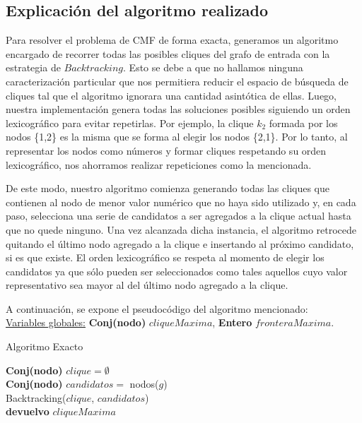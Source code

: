 \subsection{Explicación del algoritmo realizado}

Para resolver el problema de CMF de forma exacta, generamos un algoritmo encargado de recorrer todas las posibles cliques del grafo de entrada con la estrategia de $Backtracking$. Esto se debe a que no hallamos ninguna caracterización particular que nos permitiera reducir el espacio de búsqueda de cliques tal que el algoritmo ignorara una cantidad asintótica de ellas. Luego, nuestra implementación genera todas las soluciones posibles siguiendo un orden lexicográfico para evitar repetirlas. Por ejemplo, la clique $k_{2}$ formada por los nodos \{1,2\} es la misma que se forma al elegir los nodos \{2,1\}. Por lo tanto, al representar los nodos como números y formar cliques respetando su orden lexicográfico, nos ahorramos realizar repeticiones como la mencionada. 

De este modo, nuestro algoritmo comienza generando todas las cliques que contienen al nodo de menor valor numérico que no haya sido utilizado y, en cada paso, selecciona una serie de candidatos a ser agregados a la clique actual hasta que no quede ninguno. Una vez alcanzada dicha instancia, el algoritmo retrocede quitando el último nodo agregado a la clique e insertando al próximo candidato, si es que existe. El orden lexicográfico se respeta al momento de elegir los candidatos ya que sólo pueden ser seleccionados como tales aquellos cuyo valor representativo sea mayor al del último nodo agregado a la clique.

A continuación, se expone el pseudocódigo del algoritmo mencionado:\\

\underline{Variables globales:} \textbf{Conj(nodo)} $cliqueMaxima$, \textbf{Entero} $fronteraMaxima$.\\

\begin{algorithm}[H]
	\SetAlgoLined
	\caption{Algoritmo Exacto}

	\textbf{Conj(nodo)} $clique = \emptyset$\\
	\textbf{Conj(nodo)} $candidatos = $ nodos($g$)\\

	Backtracking($clique$, $candidatos$)\\

	\textbf{devuelvo} $cliqueMaxima$\\

\end{algorithm}

